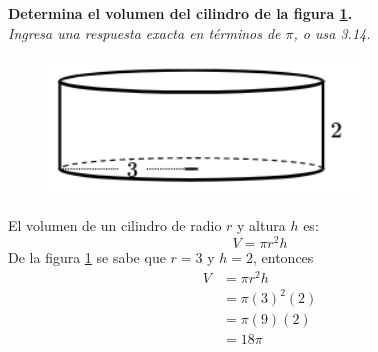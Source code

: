 \textbf{Determina el volumen del cilindro de la figura \ref{fig:vol_cil_06}.}\\
\textit{Ingresa una respuesta exacta en términos de $\pi$, o usa 3.14.}\\

\begin{minipage}[t]{0.3\linewidth}
    \begin{figure}[H]
        \centering
        \includegraphics[width=0.75\textwidth]{../images/vol_cil_06.png}
        \caption{}
        \label{fig:vol_cil_06}
    \end{figure}
\end{minipage}%
\begin{minipage}[t]{0.7\linewidth}
    \begin{solutionbox}{5cm}        El volumen de un cilindro de radio $r$ y altura $h$ es:
        \begin{equation*}
            V = \pi r^2 h
        \end{equation*}
        De la figura \ref{fig:vol_cil_06} se sabe que $r=3$ y $h=2$, entonces
        \begin{equation*}
            \begin{split}
                V & = \pi r^2 h\\
                & = \pi (3)^2 (2)\\
                & = \pi (9) (2)\\
                & = 18\pi
            \end{split}
        \end{equation*}
    \end{solutionbox}
\end{minipage}%
